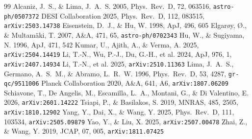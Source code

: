 \documentclass[11pt,a4paper]{article}
\begin{document}
\begin{thebibliography}{99}
 Alcaniz, J.~S., \& Lima, J.~A.~S. 2005,
  Phys.\ Rev.\ D, 72, 063516, \texttt{astro-ph/0507372}
 DESI Collaboration 2025, Phys.\ Rev.\ D, 112,
  083515, \texttt{arXiv:2503.14738}
 Eisenstein, D.~J., \& Hu, W. 1998, ApJ, 496, 605
 Elgar\o y, \O., \& Multam\"aki, T.
  2007, A\&A, 471, 65, \texttt{astro-ph/0702343}
 Hu, W., \& Sugiyama, N. 1996, ApJ, 471, 542
 Kumar, U., Ajith, A., \& Verma, A. 2025,
  \texttt{arXiv:2504.14419}
 Li, T.-N., Wu, P.-J., Du, G.-H., et al. 2024, ApJ, 976, 1,
  \texttt{arXiv:2407.14934}
 Li, T.-N., et al. 2025, \texttt{arXiv:2510.11363}
 Lima, J.~A.~S., Germano, A.~S.~M., \& Abramo, L.~R.~W.
  1996, Phys.\ Rev.\ D, 53, 4287, \texttt{gr-qc/9511006}
 Planck Collaboration 2020, A\&A, 641, A6,
  \texttt{arXiv:1807.06209}
 Schiavone, T., De Angelis, M., Escamilla,
  L.~A., Montani, G., \& Di Valentino, E. 2026, \texttt{arXiv:2601.14222}
 Tsiapi, P., \& Basilakos, S. 2019, MNRAS,
  485, 2505, \texttt{arXiv:1810.12902}
 Yang, Y., Dai, X., \& Wang, Y. 2025, Phys.\ Rev.\ D, 111, 103534,
  \texttt{arXiv:2505.09879}
 Yao, Y., \& Liu, X. 2025, \texttt{arXiv:2507.00478}
 Zhai, Z., \& Wang, Y. 2019, JCAP, 07, 005,
  \texttt{arXiv:1811.07425}
\end{thebibliography}
\end{document}
